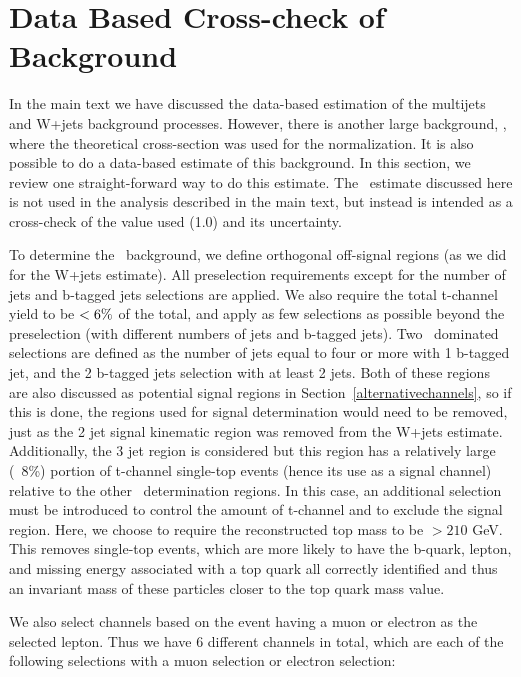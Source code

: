 \chapter{Data Based Cross-check of \ttbar~ Background}\label{app:ttbar}
In the main text we have discussed the data-based estimation of the multijets and W+jets background processes.  However, there is another large background, \ttbar, where the theoretical cross-section was used for the normalization.  It is also possible to do a data-based estimate of this background.  In this section, we review one straight-forward way to do this estimate.  The \ttbar~estimate discussed here is not used in the analysis described in the main text, but instead is intended as a cross-check of the value used (1.0) and its uncertainty.

To determine the \ttbar~background, we define orthogonal off-signal regions (as we did for the W+jets estimate).  All preselection requirements except for the number of jets and b-tagged jets selections are applied.  We also require the total t-channel yield to be $\rm <6\%$ of the total, and apply as few selections as possible beyond the preselection (with different numbers of jets and b-tagged jets).  Two \ttbar~dominated selections are defined as the number of jets equal to four or more with 1 b-tagged jet, and the 2 b-tagged jets selection with at least 2 jets.  Both of these regions are also discussed as potential signal regions in Section~\ref{alternativechannels}, so if this is done, the regions used for signal determination would need to be removed, just as the 2 jet signal kinematic region was removed from the W+jets estimate.  Additionally, the 3 jet region is considered but this region has a relatively large (~8\%) portion of t-channel single-top events (hence its use as a signal channel) relative to the other \ttbar~determination regions.  In this case, an additional selection must be introduced to control the amount of t-channel and to exclude the signal region.  Here, we choose to require the reconstructed top mass to be $> 210$ GeV.  This removes single-top events, which are more likely to have the b-quark, lepton, and missing energy associated with a top quark all correctly identified and thus an invariant mass of these particles closer to the top quark mass value.

We also select channels based on the event having a muon or electron as the selected lepton.  Thus we have 6 different channels in total, which are each of the following selections with a muon selection or electron selection:

